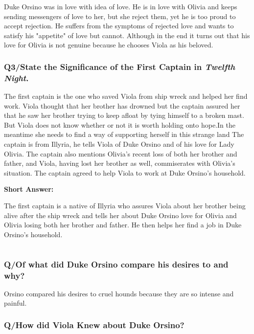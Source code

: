 \documentclass[12pt, a4paper]{article}
\begin{document}
Duke Orsino was in love with idea of love. He is in love with Olivia
and keeps sending messengers of love to her, but she reject them, yet he 
is too proud to accept rejection. He suffers from the symptoms of 
rejected love and wants to satisfy his "appetite" of love but cannot.
Although in the end it turns out that his love for Olivia is not genuine
because he chooses Viola as his beloved.

\subsubsection*{Q3/State the Significance of the First Captain in 
\textit{Twelfth Night}.}

The first captain is the one who saved Viola from ship wreck and 
helped her find work. Viola thought that her brother has drowned but 
the captain assured her that he saw her brother trying to keep afloat 
by tying himself to a broken mast. But Viola does not know whether 
or not it is worth holding onto hope.In the meantime she needs to find 
a way of supporting herself in this strange land The captain is from 
Illyria, he tells Viola of Duke Orsino and of his love for Lady Olivia. 
The captain also mentions Olivia's recent loss of both her brother and 
father,  and Viola, having lost her brother as well, commiserates with 
Olivia's situation. The captain agreed to help Viola to work at Duke 
Orsino's household.\medbreak

\textbf{Short Answer:}\smallbreak

The first captain is a native of Illyria who assures Viola about her
brother being alive after the ship wreck and tells her about Duke Orsino
love for Olivia and Olivia losing both her brother and father. 
He then helps her find a job in Duke Orsino's household.

\newpage
\section*{}\bigbreak

\subsubsection*{Q/Of what did Duke Orsino compare his desires to and why?}

Orsino compared his desires to cruel hounds because they are so intense 
and painful.

\subsubsection*{Q/How did Viola Knew about Duke Orsino?}
\end{document}
